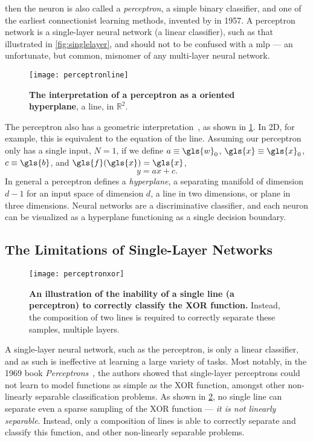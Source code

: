 \documentclass[thesis]{subfiles}
\begin{document}
then the neuron is also called a \emph{perceptron}, a simple binary classifier, and one of the earliest connectionist learning methods, invented by \citet{rosenblatt1958perceptron} in 1957. A perceptron network is a single-layer neural network (\ie a linear classifier), such as that illustrated in \cref{fig:singlelayer}, and should not to be confused with a \gls{mlp} --- an unfortunate, but common, misnomer of any multi-layer neural network.
\begin{figure}[tbp]
\centering
\texttt{[image: perceptronline]}
\caption[The interpretation of a perceptron as a hyperplane]{\textbf{The interpretation of a perceptron as a oriented hyperplane}, \ie a line, in $\mathbb{R}^2$.}
\label{fig:hyperplane}
\end{figure}
The perceptron also has a geometric interpretation~\citep{Bishop1995}, as shown in \cref{fig:hyperplane}. In 2D, for example, this is equivalent to the equation of the line. Assuming our perceptron only has a single input, \ie $N=1$, if we define $a\equiv \gls{w}_0$, $\gls{x} \equiv \gls{x}_0$, $c \equiv \gls{b}$, and $\gls{f}(\gls{x}) = \gls{x}$,
%
\begin{equation}
y = a x + c.
\end{equation}
%
In general a perceptron defines a \emph{hyperplane}, a separating manifold of dimension $d - 1$ for an input space of dimension $d$, a line in two dimensions, or plane in three dimensions. Neural networks are a discriminative classifier, and each neuron can be visualized as a hyperplane functioning as a single decision boundary.

\subsection{The Limitations of Single-Layer Networks}\label{singlelayernetworks}
\begin{figure}[tbp]
\centering
\texttt{[image: perceptronxor]}
\caption[An illustration of the inability to correctly classify the XOR function]{\textbf{An illustration of the inability of a single line (\ie a perceptron) to correctly classify the XOR function.} Instead, the composition of two lines is required to correctly separate these samples, \ie multiple layers.}
\label{fig:perceptronxor}
\end{figure}
A single-layer neural network, such as the perceptron, is only a linear classifier, and as such is ineffective at learning a large variety of tasks. Most notably, in the 1969 book \emph{Perceptrons}~\citep{minsky1988perceptrons}, the authors showed that single-layer perceptrons could not learn to model functions as simple as the XOR function, amongst other non-linearly separable classification problems. As shown in \cref{fig:perceptronxor}, no single line can separate even a sparse sampling of the XOR function --- \ie\emph{it is not linearly separable}. Instead, only a composition of lines is able to correctly separate and classify this function, and other non-linearly separable problems.
\end{document}
